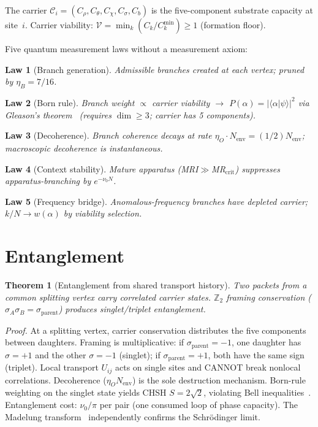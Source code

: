 \documentclass[11pt,twocolumn]{article}
\newtheorem{theorem}{Theorem}
\newtheorem{law}{Law}
\begin{document}
The carrier $\mathcal{C}_i=(C_\rho,C_\theta,C_\chi,C_\sigma,C_b)$ is the five-component substrate capacity at site~$i$.
Carrier viability: $\mathcal{V}=\min_k(C_k/C_k^{\min})\geq 1$ (formation floor).

Five quantum measurement laws without a measurement axiom:

\begin{law}[Branch generation]
Admissible branches created at each vertex; pruned by $\eta_B=7/16$.
\end{law}

\begin{law}[Born rule]
Branch weight $\propto$ carrier viability $\to$ $P(\alpha)=|\langle\alpha|\psi\rangle|^2$ via Gleason's theorem~\cite{gleason1957} (requires $\dim\geq 3$; carrier has 5 components).
\end{law}

\begin{law}[Decoherence]
Branch coherence decays at rate $\eta_O\cdot N_{\mathrm{env}}=(1/2)N_{\mathrm{env}}$; macroscopic decoherence is instantaneous.
\end{law}

\begin{law}[Context stability]
Mature apparatus (MRI$\gg$MR$_{\mathrm{crit}}$) suppresses apparatus-branching by $e^{-\nu_0 N}$.
\end{law}

\begin{law}[Frequency bridge]
Anomalous-frequency branches have depleted carrier; $k/N\to w(\alpha)$ by viability selection.
\end{law}

\section{Entanglement}
\label{sec:entangle}

\begin{theorem}[Entanglement from shared transport history]
\label{thm:entangle}
Two packets from a common splitting vertex carry correlated carrier states.
$\mathbb{Z}_2$ framing conservation ($\sigma_A\sigma_B=\sigma_{\mathrm{parent}}$) produces singlet/triplet entanglement.
\end{theorem}

\textit{Proof.}
At a splitting vertex, carrier conservation distributes the five components between daughters.
Framing is multiplicative: if $\sigma_{\mathrm{parent}}=-1$, one daughter has $\sigma=+1$ and the other $\sigma=-1$ (singlet); if $\sigma_{\mathrm{parent}}=+1$, both have the same sign (triplet).
Local transport $U_{ij}$ acts on single sites and CANNOT break nonlocal correlations.
Decoherence ($\eta_O N_{\mathrm{env}}$) is the sole destruction mechanism.
Born-rule weighting on the singlet state yields CHSH $S=2\sqrt{2}$, violating Bell inequalities~\cite{gleason1957}.
Entanglement cost: $\nu_0/\pi$ per pair (one consumed loop of phase capacity).
The Madelung transform~\cite{madelung1927} independently confirms the Schr\"odinger limit.
\end{document}
